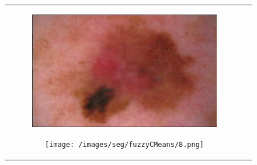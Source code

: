 \documentclass[a4paper, 10pt, conference]{ieeeconf}        %
\begin{document}
\begin{figure}[ht!]
\begin{tabular}{c c}
 \begin{subfigure}{0.2\textwidth}
  \includegraphics[scale=0.15]{original08.JPG}\caption{}
  \end{subfigure}
  \begin{subfigure}{0.2\textwidth}
  \texttt{[image: /images/seg/fuzzyCMeans/8.png]}\caption{}
  \end{subfigure}\\    
 \end{tabular}
 \end{figure}
 
 \clearpage
\end{document}
